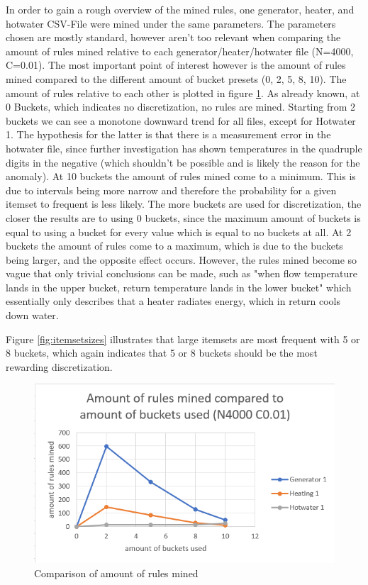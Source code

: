 \documentclass[bachelor,english]{info1thesis}
\begin{document}
In order to gain a rough overview of the mined rules, one generator, heater, and hotwater CSV-File were mined under the same parameters. The parameters chosen are mostly standard, however aren't too relevant when comparing the amount of rules mined relative to each generator/heater/hotwater file (N=4000, C=0.01). The most important point of interest however is the amount of rules mined compared to the different amount of bucket presets (0, 2, 5, 8, 10). The amount of rules relative to each other is plotted in figure \ref{fig:amountofrules}. As already known, at 0 Buckets, which indicates no discretization, no rules are mined. Starting from 2 buckets we can see a monotone downward trend for all files, except for Hotwater 1. The hypothesis for the latter is that there is a measurement error in the hotwater file, since further investigation has shown temperatures in the quadruple digits in the negative (which shouldn't be possible and is likely the reason for the anomaly). 
At 10 buckets the amount of rules mined come to a minimum. This is due to intervals being more narrow and therefore the probability for a given itemset to frequent is less likely. The more buckets are used for discretization, the closer the results are to using 0 buckets, since the maximum amount of buckets is equal to using a bucket for every value which is equal to no buckets at all.
At 2 buckets the amount of rules come to a maximum, which is due to the buckets being larger, and the opposite effect occurs. However, the rules mined become so vague that only trivial conclusions can be made, such as "when flow temperature lands in the upper bucket, return temperature lands in the lower bucket" which essentially only describes that a heater radiates energy, which in return cools down water.

Figure \ref{fig:itemsetsizes} illustrates that large itemsets are most frequent with 5 or 8 buckets, which again indicates that 5 or 8 buckets should be the most rewarding discretization.

\begin{figure}[htb]
	\begin{center}
		\includegraphics[scale=0.65]{abbildungen/amountofrules.PNG}
		\caption{Comparison of amount of rules mined}
			\label{fig:amountofrules}
	\end{center}
\end{figure}
\end{document}
